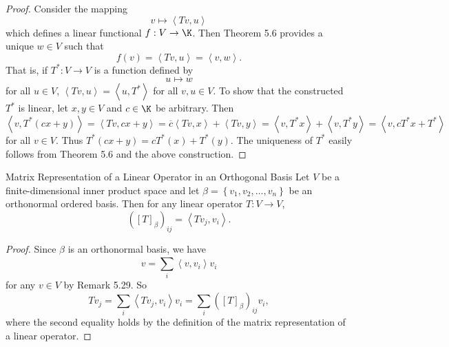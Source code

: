 \documentclass[linearalgebraII]{subfiles}
\begin{document}
    \begin{proof}
        Consider the mapping
        \begin{equation*}
            v\mapsto \left\langle Tv, u\right\rangle 
        \end{equation*}
        which defines a linear functional $f:V\to\K$. Then Theorem 5.6 provides a unique $w\in V$ such that
        \begin{equation*}
            f\left( v \right) = \left\langle Tv, u\right\rangle = \left\langle v, w\right\rangle .
        \end{equation*}
        That is, if $T^*:V\to V$ is a function defined by 
        \begin{equation*}
            u\mapsto w
        \end{equation*}
        for all $u\in V$, $\left\langle Tv, u\right\rangle = \left\langle u, T^*\right\rangle$ for all $v,u\in V$. To show that the constructed $T^*$ is linear, let $x,y\in V$ and $c\in\K$ be arbitrary. Then
        \begin{equation*}
            \left\langle v, T^*(cx+y)\right\rangle = \left\langle Tv, cx+y\right\rangle = \overline{c}\left\langle Tv, x\right\rangle + \left\langle Tv, y\right\rangle = \left\langle v, T^*x\right\rangle + \left\langle v, T^*y\right\rangle = \left\langle v, cT^*x+T^*\right\rangle 
        \end{equation*}
        for all $v\in V$. Thus $T^*(cx+y) = cT^*(x)+T^*(y)$. The uniqueness of $T^*$ easily follows from Theorem 5.6 and the above construction.
    \end{proof}

    \begin{prop}{Matrix Representation of a Linear Operator in an Orthogonal Basis}
        Let $V$ be a finite-dimensional inner product space and let $\beta = \left\lbrace v_1,v_2,\ldots,v_n \right\rbrace$ be an orthonormal ordered basis. Then for any linear operator $T:V\to V$,
        \begin{equation*}
            \left( \left[ T \right] _\beta \right) _{ij} = \left\langle Tv_j, v_i\right\rangle .
        \end{equation*}
    \end{prop}

    \begin{proof}
        Since $\beta$ is an orthonormal basis, we have
        \begin{equation*}
            v = \sum^{}_{i} \left\langle v, v_i\right\rangle v_i
        \end{equation*}
        for any $v\in V$ by Remark 5.29. So
        \begin{equation*}
            Tv_j = \sum^{}_{i} \left\langle Tv_j, v_i\right\rangle v_i = \sum^{}_{i} \left( \left[ T \right] _\beta \right) _{ij}v_i,
        \end{equation*}
        where the second equality holds by the definition of the matrix representation of a linear operator.
    \end{proof}
\end{document}
